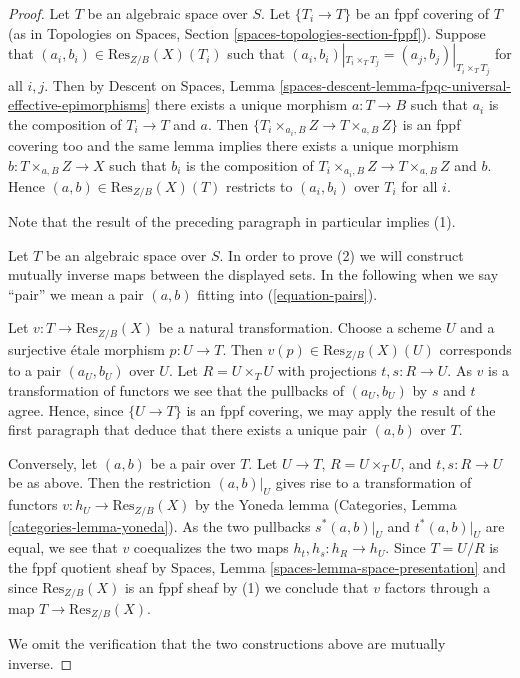 \documentclass{stacks-project}
\theoremstyle{plain}
\theoremstyle{definition}
\theoremstyle{remark}
\numberwithin{equation}{subsection}
\begin{document}
\begin{proof}
Let $T$ be an algebraic space over $S$. Let $\{T_i \to T\}$ be an fppf
covering of $T$ (as in
Topologies on Spaces, Section \ref{spaces-topologies-section-fppf}).
Suppose that $(a_i, b_i) \in \text{Res}_{Z/B}(X)(T_i)$ such
that $(a_i, b_i)|_{T_i \times_T T_j} = (a_j, b_j)|_{T_i \times_T T_j}$
for all $i, j$. Then by
Descent on Spaces,
Lemma \ref{spaces-descent-lemma-fpqc-universal-effective-epimorphisms}
there exists a unique morphism $a : T \to B$ such that $a_i$ is the
composition of $T_i \to T$ and $a$. Then
$\{T_i \times_{a_i, B} Z \to T \times_{a, B} Z\}$ is an fppf covering
too and the same lemma implies there exists a unique morphism
$b : T \times_{a, B} Z \to X$ such that $b_i$ is the composition
of $T_i \times_{a_i, B} Z \to T \times_{a, B} Z$ and $b$. Hence
$(a, b) \in \text{Res}_{Z/B}(X)(T)$ restricts to $(a_i, b_i)$
over $T_i$ for all $i$.

\medskip\noindent
Note that the result of the preceding paragraph in particular implies (1).

\medskip\noindent
Let $T$ be an algebraic space over $S$. In order to prove (2) we will
construct mutually inverse maps between the displayed sets. In the
following when we say ``pair'' we mean a pair $(a, b)$ fitting
into (\ref{equation-pairs}).

\medskip\noindent
Let $v : T \to \text{Res}_{Z/B}(X)$ be a natural transformation.
Choose a scheme $U$ and a surjective \'etale morphism $p : U \to T$.
Then $v(p) \in \text{Res}_{Z/B}(X)(U)$ corresponds to a pair $(a_U, b_U)$
over $U$. Let $R = U \times_T U$ with projections $t, s : R \to U$.
As $v$ is a transformation of functors we see that the pullbacks of
$(a_U, b_U)$ by $s$ and $t$ agree. Hence, since $\{U \to T\}$ is an
fppf covering, we may apply the result of the first paragraph that
deduce that there exists a unique pair $(a, b)$ over $T$.

\medskip\noindent
Conversely, let $(a, b)$ be a pair over $T$.
Let $U \to T$, $R = U \times_T U$, and $t, s : R \to U$ be as
above. Then the restriction $(a, b)|_U$ gives rise to a
transformation of functors $v : h_U \to \text{Res}_{Z/B}(X)$ by the
Yoneda lemma
(Categories, Lemma \ref{categories-lemma-yoneda}).
As the two pullbacks $s^*(a, b)|_U$ and $t^*(a, b)|_U$
are equal, we see that $v$ coequalizes the two maps
$h_t, h_s : h_R \to h_U$. Since $T = U/R$ is the fppf quotient sheaf by
Spaces, Lemma \ref{spaces-lemma-space-presentation}
and since $\text{Res}_{Z/B}(X)$ is an fppf sheaf by (1) we conclude
that $v$ factors through a map $T \to \text{Res}_{Z/B}(X)$.

\medskip\noindent
We omit the verification that the two constructions above are mutually
inverse.
\end{proof}
\end{document}
